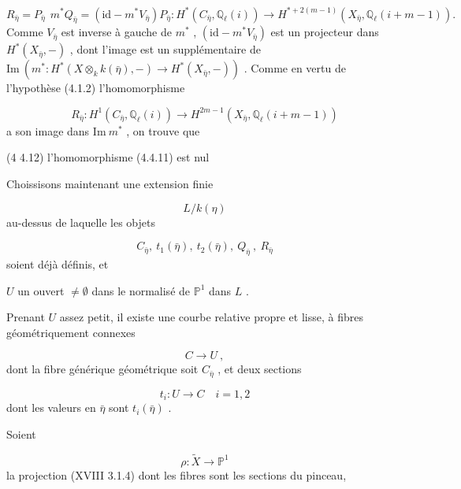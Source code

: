 \begin{equation}\tag{4.4.10}
R_{\bar\eta} = P_{\bar\eta} \ \ m^*Q_{\bar\eta} = (\mathrm{id}-m^*V_{\bar\eta})P_{\bar\eta} : H^*(C_{\bar\eta},\mathbb{Q}_\ell(i)) \longrightarrow H^{*+2(m-1)}(X_{\bar\eta},\mathbb{Q}_\ell(i+m-1)).
\end{equation}
Comme $V_{\bar\eta}$ est inverse à gauche de $m^*$ , $(\mathrm{id}-m^*V_{\bar\eta})$ est un projecteur dans $H^*(X_{\bar\eta}, -)$ , dont l'image est un supplémentaire de $\mathrm{Im}\ (m^* : H^*(X \otimes_k k(\bar\eta),-) \longrightarrow H^*(X_{\bar\eta},-))$ . Comme en vertu de l'hypothèse (4.1.2) l'homomorphisme

\begin{equation}\tag{4.4.11}
R_{\bar\eta} : H^1(C_{\bar\eta},\mathbb{Q}_\ell(i)) \longrightarrow H^{2m-1}(X_{\bar\eta},\mathbb{Q}_\ell(i+m-1))
\end{equation}
a son image dans $\mathrm{Im}\ m^*$ , on trouve que

(4 4.12) \quad l'homomorphisme (4.4.11) est nul

Choissisons maintenant une extension finie

\begin{equation*}
L/k(\eta)
\end{equation*}
au-dessus de laquelle les objets

\begin{equation*}
C_{\bar\eta}, \ t_1(\bar\eta), \ t_2(\bar\eta), \ Q_{\bar\eta} \ , \ R_{\bar\eta}
\end{equation*}
soient déjà définis, et

$U$  un ouvert $\neq \emptyset$  dans le normalisé de $\mathbb{P}^1$  dans  $L$ .

Prenant $U$ assez petit, il existe une courbe relative propre et lisse, à fibres géométriquement connexes 



\begin{equation*}
 C \longrightarrow U \ ,
\end{equation*}
dont la fibre générique géométrique soit $C_{\bar\eta}$ , et deux sections

\begin{equation*}
t_i : U \longrightarrow C \quad i = 1, 2
\end{equation*}
dont les valeurs en $\bar\eta$ sont $t_i(\bar\eta)$ .

Soient

\begin{equation*}
\rho : \widetilde{X} \longrightarrow \mathbb{P}^1
\end{equation*}
la projection (XVIII 3.1.4) dont les fibres sont les sections du pinceau,

